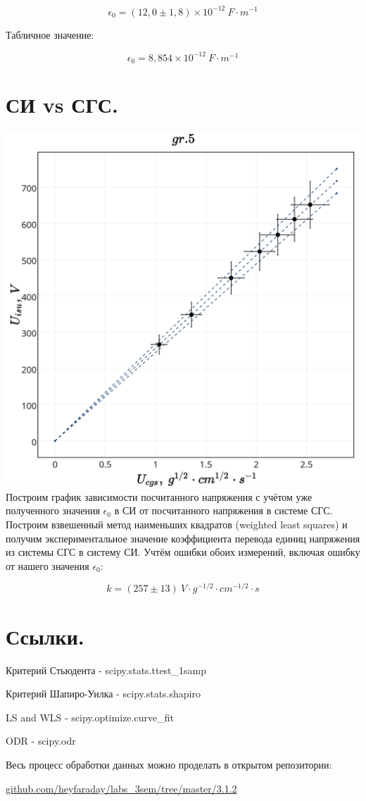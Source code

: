$$\boxed{\epsilon_0 = (12,0 \pm 1,8) \times 10^{-12} \ F \cdot m^{-1}}$$

Табличное значение:

$$\epsilon_0 = 8,854 \times 10^{-12} \ F\cdot m^{-1} $$


\section{\label{sec:level1}СИ vs СГС.}
\includegraphics[scale = 0.20]{my_plot5.png}\\

Построим график зависимости посчитанного напряжения с учётом уже полученного значения $\epsilon_0$ в СИ от посчитанного напряжения в системе СГС. \\

Построим взвешенный метод наименьших квадратов (weighted least squares) и получим экспериментальное значение коэффициента перевода единиц напряжения из системы СГС в систему СИ. Учтём ошибки обоих измерений, включая ошибку от нашего значения $\epsilon_0$:

$$\boxed{k = (257 \pm 13) \ V \cdot g^{-1/2} \cdot cm^{-1/2} \cdot s}$$

\section{\label{sec:level1}Ссылки.}

Критерий Стьюдента - scipy.stats.ttest\_1samp

Критерий Шапиро-Уилка - scipy.stats.shapiro

LS and WLS - scipy.optimize.curve\_fit

ODR - scipy.odr

Весь процесс обработки данных можно проделать в открытом репозитории:

\href{github.com/heyfaraday/labs_3sem/tree/master/3.1.2}{github.com/heyfaraday/labs\_3sem/tree/master/3.1.2}

